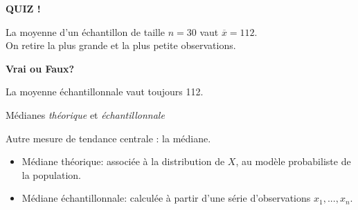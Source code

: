 \documentclass{BeamerTemplate}
\begin{document}
\begin{frame}[t]{ }

\centerline{\LARGE\bf \alert{QUIZ !}}
\bigskip

La moyenne d'un échantillon de taille $n=30$ vaut $\overline x =112$. \\
On retire la plus grande et la plus petite observations.
\bigskip

{\bf Vrai ou Faux?}
\bigskip

La moyenne échantillonnale vaut toujours 112.
\vspace{2cm}


\end{frame}
\begin{frame}[t]{Médianes {\it théorique} et {\it échantillonnale}}

Autre mesure de tendance centrale : la médiane.

\medskip
\begin{itemize}


\item \alert{Médiane théorique}: associée à la distribution de $X$, au modèle probabiliste de la population.
\item \alert{Médiane échantillonnale}: calculée à partir d'une série d'observations $x_1,..., x_n$.

\end{itemize}
\vspace{3mm}

\end{frame}
\end{document}
